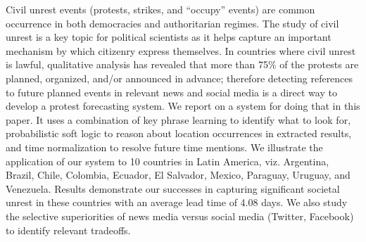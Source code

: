 Civil unrest events (protests, strikes, and ``occupy'' events) are common occurrence in both democracies and authoritarian regimes. The study of civil unrest is a key topic for political scientists as it helps capture an important mechanism by which citizenry express themselves. In countries where civil unrest is lawful, qualitative analysis has revealed that more than 75\% of the protests are planned, organized, and/or announced in advance; therefore detecting references to future planned events in relevant news and social media is a direct way to develop a protest forecasting system. We report on a system for doing that in this paper. It uses a combination of key phrase learning to identify what to look for, probabilistic soft logic to reason about location occurrences in extracted results, and time normalization to resolve future time mentions. We illustrate the application of our system to 10 countries in Latin America, viz. Argentina, Brazil, Chile, Colombia, Ecuador, El Salvador, Mexico, Paraguay, Uruguay, and Venezuela. Results demonstrate our successes in capturing significant societal unrest in these countries with an average lead time of 4.08 days. We also study the selective superiorities of news media versus social media (Twitter, Facebook) to identify relevant tradeoffs.
